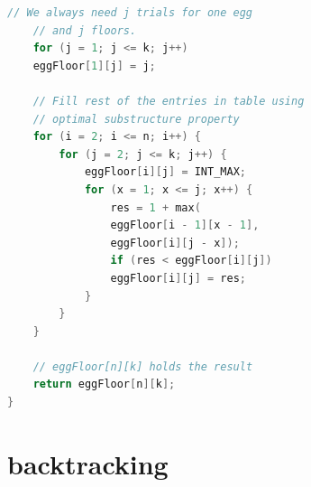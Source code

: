 \documentclass[a4paper,11pt,twoside]{book}
\begin{document}
\begin{itemize}
\begin{lstlisting}[frame=single, language=c++]
	// We always need j trials for one egg
	// and j floors.
	for (j = 1; j <= k; j++)
	eggFloor[1][j] = j;
	
	// Fill rest of the entries in table using
	// optimal substructure property
	for (i = 2; i <= n; i++) {
		for (j = 2; j <= k; j++) {
			eggFloor[i][j] = INT_MAX;
			for (x = 1; x <= j; x++) {
				res = 1 + max(
				eggFloor[i - 1][x - 1],
				eggFloor[i][j - x]);
				if (res < eggFloor[i][j])
				eggFloor[i][j] = res;
			}
		}
	}
	
	// eggFloor[n][k] holds the result
	return eggFloor[n][k];
}
\end{lstlisting}



\end{itemize}



\section{backtracking}
\end{document}
